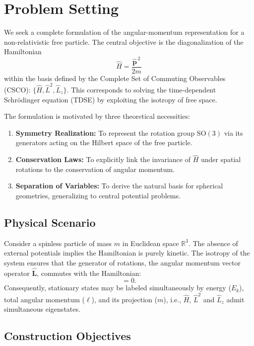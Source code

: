 \section{Problem Setting}

We seek a complete formulation of the angular-momentum representation for a
non-relativistic free particle. The central objective is the diagonalization of
the Hamiltonian
\begin{equation}
  \hat{H} = \frac{\hat{\mathbf{p}}^{\,2}}{2m}
\end{equation}
within the basis defined by the Complete Set of Commuting Observables (CSCO):
$\{ \hat{H}, \hat{L}^2, \hat{L}_z \}$. This corresponds to solving the
time-dependent Schr\"odinger equation (TDSE) by exploiting the isotropy of free
space.

The formulation is motivated by three theoretical necessities:
\begin{enumerate}
  \item \textbf{Symmetry Realization:} To represent the rotation group
    $\mathrm{SO}(3)$
  via its generators acting on the Hilbert space of the free particle.
  \item \textbf{Conservation Laws:} To explicitly link the invariance of
  $\hat{H}$ under spatial rotations to the conservation of angular momentum.
  \item \textbf{Separation of Variables:} To derive the natural basis for
  spherical geometries, generalizing to central potential problems.
\end{enumerate}

\subsection{Physical Scenario}

Consider a spinless particle of mass $m$ in Euclidean space $\mathbb{R}^3$. The
absence of external potentials implies the Hamiltonian is purely kinetic. The
isotropy of the system ensures that the generator of rotations, the angular
momentum vector operator $\hat{\mathbf{L}}$, commutes with the Hamiltonian:
\begin{equation}
  [\hat{H}, \hat{\mathbf{L}}] = 0.
\end{equation}
Consequently, stationary states may be labeled simultaneously by energy ($E_k$),
total angular momentum ($\ell$), and its projection ($m$), i.e., $\hat{H}$,
$\hat{L}^2$ and $\hat{L}_z$ admit simultaneous eigenstates.

\subsection{Construction Objectives}

